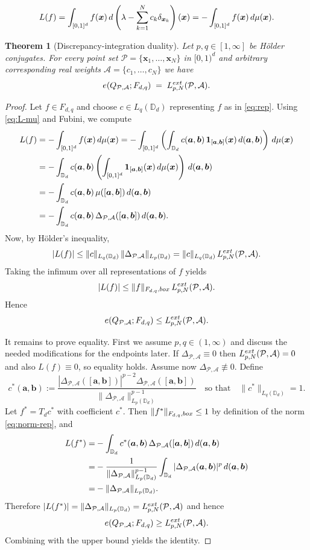 \documentclass[10pt,a4paper]{amsart}
\newtheorem{thm}{Theorem}
\newcommand{\D}{\mathbb{D}}
\newcommand{\bsa}{{\boldsymbol a}}
\newcommand{\bsb}{{\boldsymbol b}}
\newcommand{\bsx}{{\boldsymbol x}}
\newcommand{\bx}{{\rm box}}
\newcommand{\cA}{\mathcal{A}}
\newcommand{\cP}{\mathcal{P}}
\newcommand{\ex}{{\rm ext}}
\newcommand{\rd}{\,{\rm d}}
\begin{document}
\begin{equation}\label{eq:L-mu}
L(f)=\int_{[0,1]^d} f(\bsx) \rd\left(\lambda-\sum_{k=1}^N c_k\delta_{\bsx_k}\right)(\bsx)
= -\int_{[0,1]^d} f(\bsx) \rd\mu(\bsx).
\end{equation}

\begin{thm}[Discrepancy-integration duality]\label{thm:main}
Let $p,q \in [1,\infty ]$ be H\"older conjugates. For every point set 
$\cP=\{\bsx_1,\ldots,\bsx_N\}$ in $[0,1)^d$ and arbitrary corresponding real weights $\cA=\{c_1,\ldots,c_N\}$ we have
\[
e(Q_{\cP,\cA};F_{d,q}) \;=\; L_{p,N}^{\ex}(\cP,\cA).
\]
\end{thm}

\begin{proof}
Let $f\in F_{d,q}$ and choose $c\in L_q(\D_d)$ representing $f$ as in \eqref{eq:rep}.
Using \eqref{eq:L-mu} and Fubini, we compute
\begin{align*}
L(f)
&= -\int_{[0,1]^d}  f(\bsx) \rd\mu(\bsx)
= -\int_{[0,1]^d} \left(\int_{\D_d} c(\bsa,\bsb) \,{\bf 1}_{[\bsa,\bsb]}(\bsx)\rd (\bsa,\bsb)\right) \rd \mu(\bsx)\\
&= -\int_{\D_d} c(\bsa,\bsb)\left(\int_{[0,1]^d} {\bf 1}_{[\bsa,\bsb]}(\bsx)\,d\mu(\bsx)\right) \rd (\bsa,\bsb)\\
&= -\int_{\D_d} c(\bsa,\bsb) \,\mu([\bsa,\bsb]) \rd (\bsa,\bsb)\\
&= -\int_{\D_d} c(\bsa,\bsb)\,\Delta_{\cP,\cA}([\bsa,\bsb]) \rd (\bsa,\bsb).
\end{align*}
Now, by Hölder's inequality,
\[
|L(f)|
\le \|c\|_{L_q(\D_d)}\,\|\Delta_{\cP,\cA}\|_{L_p(\D_d)}
= \|c\|_{L_q(\D_d)}\,L_{p,N}^{\ex}(\cP,\cA).
\]
Taking the infimum over all representations of $f$ yields
\[
|L(f)| \le \|f\|_{F_{d,q},\bx}\,L_{p,N}^{\ex}(\cP,\cA).
\]
Hence $$e(Q_{\cP,\cA};F_{d,q})\le L_{p,N}^{\ex}(\cP,\cA).$$

It remains to prove equality. First we assume $p,q \in (1, \infty)$ and discuss the needed modifications 
for the endpoints later. If $\Delta_{\cP,\cA} \equiv 0$ then $L_{p,N}^{\ex}(\cP,\cA)=0$ and also $L(f)\equiv 0$, 
so equality holds. Assume now $\Delta_{\cP,\cA}\not\equiv 0$. Define 
\begin{equation}\label{eq:cstar}
c^{\ast}(\bsa,\bsb):=\frac{|\Delta_{\cP,\cA}([\bsa,\bsb])|^{p-2} \Delta_{\cP,\cA}([\bsa,\bsb])}{\|\Delta_{\cP,\cA}\|_{L_p(\D_d)}^{p-1}}
\quad\text{so that}\quad
\|c^{\ast}\|_{L_q(\D_d)}=1.
\end{equation}
Let $f^\ast=T_d c^\ast$ with coefficient $c^\ast$. Then $\|f^\ast\|_{F_{d,q},\bx}\le 1$ by definition of the norm \eqref{eq:norm-rep}, and
\begin{align*}
L(f^\ast)
= & -\int_{\D_d} c^\ast(\bsa,\bsb)\,\Delta_{\cP,\cA}([\bsa,\bsb])\rd (\bsa,\bsb) \\
= & -\frac{1}{\|\Delta_{\cP,\cA}\|_{L_p(\D_d)}^{p-1}}\int_{\D_d}|\Delta_{\cP,\cA}(\bsa,\bsb)|^p \rd (\bsa,\bsb)\\
= & -\|\Delta_{\cP,\cA}\|_{L_p(\D_d)}.
\end{align*}
Therefore $|L(f^\ast)|=\|\Delta_{\cP,\cA}\|_{L_p(\D_d)}=L_{p,N}^{\ex}(\cP,\cA)$ and hence
$$e(Q_{\cP,\cA};F_{d,q})\ge L_{p,N}^{\ex}(\cP,\cA).$$ Combining with the upper bound yields the identity.


\end{proof}
\end{document}
